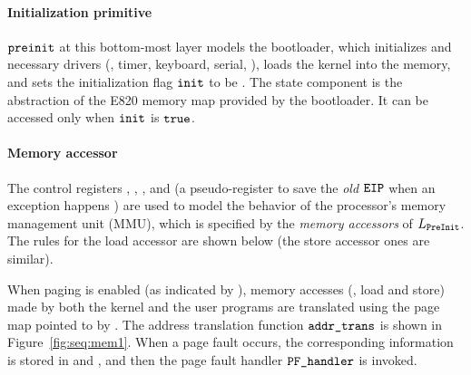 \paragraph{Initialization primitive}
${\texttt{preinit}}$
at this bottom-most layer models the bootloader,
which initializes  and necessary drivers
(\eg, timer, keyboard, serial, {\etc}),
loads the kernel into the memory,
and sets the initialization flag ${\texttt{init}}$ to be .
The state component  is the abstraction of the
E820 memory map provided by the bootloader.
It can be accessed only when 
${\texttt{init}}$ is ${\texttt{true}}$.

\paragraph{Memory accessor} 
The control registers , ,  ,
and 
(a pseudo-register to save the \emph{old ${\texttt{EIP}}$} when an exception happens
)
are used to model the behavior
of the processor's memory management unit (MMU),
which is specified by the \emph{memory accessors}
of $L_{\texttt{PreInit}}$.
The rules for the load accessor are shown below
(the store accessor ones are similar).

When paging is enabled (as indicated by ),
memory accesses (\ie, load and store) made by both the kernel and the user programs
are translated using the page map pointed to by .
The address translation function
${\texttt{addr\_trans}}$ is
shown in Figure~\ref{fig:seq:mem1}.
When a page fault occurs,
the corresponding information is stored in 
and ,
and then the page fault handler ${\texttt{PF\_handler}}$ is invoked.


